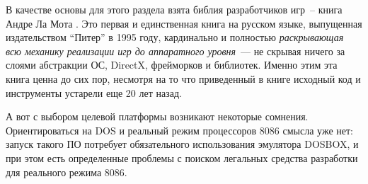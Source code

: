 \label{gamedev}

В качестве основы для этого раздела взята библия разработчиков игр\ -- книга
Андре Ла Мота \cite{lamot}. Это первая и единственная книга на русском языке,
выпущенная издательством ``Питер'' в 1995 году, кардинально и полностью
\emph{раскрывающая всю механику реализации игр до аппаратного уровня}\ --- не
скрывая ничего за слоями абстракции ОС, DirectX, фрейморков и библиотек. Именно
этим эта книга ценна до сих пор, несмотря на то что приведенный в книге исходный
код и инструменты устарели еще 20 лет назад.

А вот с выбором целевой платформы возникают некоторые сомнения. Ориентироваться
на DOS и реальный режим процессоров 8086 смысла уже нет: запуск такого ПО
потребует обязательного использования эмулятора DOSBOX, и при этом есть
определенные проблемы с поиском легальных средства разработки для реального
режима 8086.
